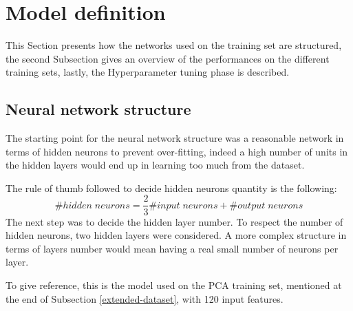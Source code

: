 \section{Model definition}
\label{model-definition}
This Section presents how the networks used on the training set are 
structured, the second Subsection gives an overview of the performances 
on the different training sets, lastly, the Hyperparameter tuning phase
is described.

\subsection{Neural network structure}
The starting point for the neural network structure was a 
reasonable network in terms of hidden neurons to prevent over-fitting, 
indeed a high number of units in the hidden layers would end up in learning 
too much from the dataset.

The rule of thumb followed to decide hidden neurons quantity is the 
following: 
$$\#\mathit{hidden\; neurons} = \frac{2}{3}\#\mathit{input\;neurons}
+ \#\mathit{output\;neurons}$$
The next step was to decide the hidden layer number. To respect the 
number of hidden neurons, two hidden layers were considered. 
A more complex structure in terms of layers number would mean 
having a real small number of neurons per layer.

To give reference, this is the model used on the PCA training set, mentioned at 
the end of Subsection \vref{extended-dataset}, with 
120 input features.

